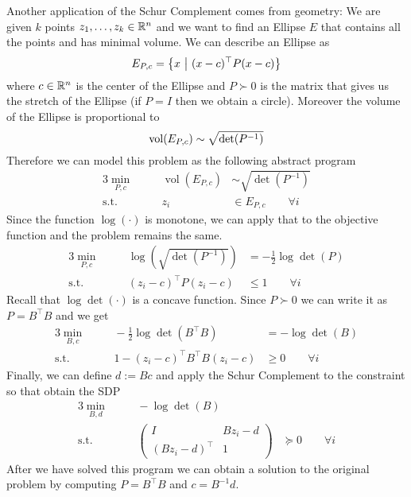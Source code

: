 \documentclass[answers]{exam}
\begin{document}
    Another application of the Schur Complement comes from geometry: We are given $k$ points $z_1, \ldots, z_k\in \mathbb{R}^n$ and we want to find an Ellipse $E$ that contains all the points and has minimal volume. We can describe an Ellipse as 
    $$ E_{P, c} = \left\{x \ \middle|\ (x-c)^\top P(x-c)\right\} $$
    where $c\in \mathbb{R}^n$ is the center of the Ellipse and $P\succ 0$ is the matrix that gives us the stretch of the Ellipse (if $P=I$ then we obtain a circle). Moreover the volume of the Ellipse is proportional to 
    $$ \operatorname{vol}(E_{P,c}) \sim \sqrt{\operatorname*{det}(P^{-1})} $$
    Therefore we can model this problem as the following abstract program
    \begin{alignat*}{3}
        \min_{P,c} &&\quad \operatorname*{vol}(E_{P,c}) &\sim \sqrt{\operatorname*{det}(P^{-1})} \\ 
        \text{s.t.}&&\quad  z_i &\in E_{P,c} \qquad \forall i
    \end{alignat*}
    Since the function $\log(\cdot)$ is monotone, we can apply that to the objective function and the problem remains the same. 
    \begin{alignat*}{3}
        \min_{P,c} &&\quad \log\left(\sqrt{\operatorname*{det}(P^{-1})}\right) &= -\frac{1}{2} \log\det(P) \\ 
        \text{s.t.}&&\quad  (z_i-c)^\top P(z_i - c) &\leq 1 \qquad \forall i
    \end{alignat*}
    Recall that $\log\det(\cdot)$ is a concave function. Since $P\succ 0$ we can write it as $P = B^\top B$ and we get 
    \begin{alignat*}{3}
        \min_{B, c} &&\quad -\frac{1}{2} \log\det(B^\top B) &= -\log\det(B) \\ 
        \text{s.t.}&&\quad  1- (z_i-c)^\top B^\top B(z_i - c) &\geq 0 \qquad \forall i
    \end{alignat*}
    Finally, we can define $d := Bc$ and apply the Schur Complement to the constraint so that obtain the SDP 
    \begin{alignat*}{3}
        \min_{B, d} &&\quad -\log\det(B)& \\ 
        \text{s.t.}&&\quad \begin{pmatrix}
            I & Bz_i - d \\ 
            (Bz_i - d)^\top & 1
        \end{pmatrix}&\succeq 0 \qquad \forall i
    \end{alignat*}
    After we have solved this program we can obtain a solution to the original problem by computing $P = B^\top B$ and $c = B^{-1}d$.
    
\end{document}
